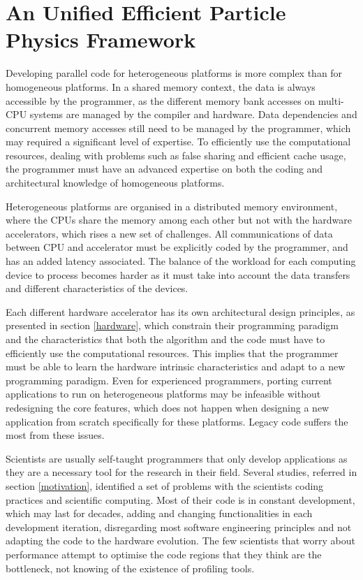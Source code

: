 \chapter{An Unified Efficient Particle Physics Framework}
\label{new_lipmini}

Developing parallel code for heterogeneous platforms is more complex than for homogeneous platforms. In a shared memory context, the data is always accessible by the programmer, as the different memory bank accesses on multi-CPU systems are managed by the compiler and hardware. Data dependencies and concurrent memory accesses still need to be managed by the programmer, which may required a significant level of expertise. To efficiently use the computational resources, dealing with problems such as false sharing and efficient cache usage, the programmer must have an advanced expertise on both the coding and architectural knowledge of homogeneous platforms.

Heterogeneous platforms are organised in a distributed memory environment, where the CPUs share the memory among each other but not with the hardware accelerators, which rises a new set of challenges. All communications of data between CPU and accelerator must be explicitly coded by the programmer, and has an added latency associated. The balance of the workload for each computing device to process becomes harder as it must take into account the data transfers and different characteristics of the devices.

Each different hardware accelerator has its own architectural design principles, as presented in section \ref{hardware}, which constrain their programming paradigm and the characteristics that both the algorithm and the code must have to efficiently use the computational resources. This implies that the programmer must be able to learn the hardware intrinsic characteristics and adapt to a new programming paradigm. Even for experienced programmers, porting current applications to run on heterogeneous platforms may be infeasible without redesigning the core features, which does not happen when designing a new application from scratch specifically for these platforms. Legacy code suffers the most from these issues.

Scientists are usually self-taught programmers that only develop applications as they are a necessary tool for the research in their field. Several studies, referred in section \ref{motivation}, identified a set of problems with the scientists coding practices and scientific computing. Most of their code is in constant development, which may last for decades, adding and changing functionalities in each development iteration, disregarding most software engineering principles and not adapting the code to the hardware evolution. The few scientists that worry about performance attempt to optimise the code regions that they think are the bottleneck, not knowing of the existence of profiling tools.

